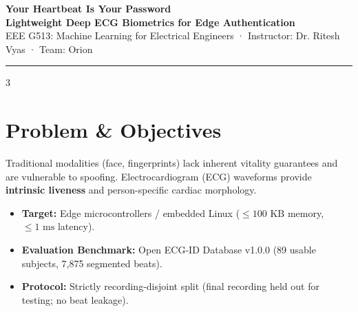 \documentclass{article}
\begin{document}
\begin{center}
{\Huge \textbf{Your Heartbeat Is Your Password}}\\[4mm]
{\Large \textbf{Lightweight Deep ECG Biometrics for Edge Authentication}}\\[2mm]
{\large EEE G513: Machine Learning for Electrical Engineers · Instructor: Dr. Ritesh Vyas · Team: Orion}
\end{center}

\vspace{5mm}
\hrule
\vspace{5mm}

\begin{multicols}{3}

\section*{\color{primary} Problem \& Objectives}
Traditional modalities (face, fingerprints) lack inherent vitality guarantees and are vulnerable to spoofing.
Electrocardiogram (ECG) waveforms provide \textbf{intrinsic liveness} and person-specific cardiac morphology.
\begin{itemize}
    \item \textbf{Target:} Edge microcontrollers / embedded Linux ($\le 100\text{ KB}$ memory, $\le 1\text{ ms}$ latency).
    \item \textbf{Evaluation Benchmark:} Open ECG-ID Database v1.0.0 (89 usable subjects, 7,875 segmented beats).
    \item \textbf{Protocol:} Strictly recording-disjoint split (final recording held out for testing; no beat leakage).
\end{itemize}


\end{multicols}
\end{document}
